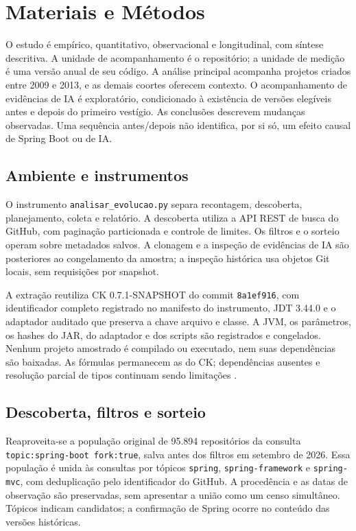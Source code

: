 \section{Materiais e Métodos}
\label{sec:metodologia}

O estudo é empírico, quantitativo, observacional e longitudinal, com síntese descritiva. A unidade de acompanhamento é o repositório; a unidade de medição é uma versão anual de seu código. A análise principal acompanha projetos criados entre 2009 e 2013, e as demais coortes oferecem contexto. O acompanhamento de evidências de IA é exploratório, condicionado à existência de versões elegíveis antes e depois do primeiro vestígio. As conclusões descrevem mudanças observadas. Uma sequência antes/depois não identifica, por si só, um efeito causal de Spring Boot ou de IA.

\subsection{Ambiente e instrumentos}
\label{subsec:ambiente}

O instrumento \texttt{analisar\_evolucao.py} separa recontagem, descoberta, planejamento, coleta e relatório. A descoberta utiliza a API REST de busca do GitHub, com paginação particionada e controle de limites. Os filtros e o sorteio operam sobre metadados salvos. A clonagem e a inspeção de evidências de IA são posteriores ao congelamento da amostra; a inspeção histórica usa objetos Git locais, sem requisições por snapshot.

A extração reutiliza CK 0.7.1-SNAPSHOT do commit \texttt{8a1ef916}, com identificador completo registrado no manifesto do instrumento, JDT 3.44.0 e o adaptador auditado que preserva a chave arquivo e classe. A JVM, os parâmetros, os hashes do JAR, do adaptador e dos scripts são registrados e congelados. Nenhum projeto amostrado é compilado ou executado, nem suas dependências são baixadas. As fórmulas permanecem as do CK; dependências ausentes e resolução parcial de tipos continuam sendo limitações \cite{aniche:ck,child:19}.

\subsection{Descoberta, filtros e sorteio}
\label{subsec:amostragem}

Reaproveita-se a população original de 95.894 repositórios da consulta \texttt{topic:spring-boot fork:true}, salva antes dos filtros em setembro de 2026. Essa população é unida às consultas por tópicos \texttt{spring}, \texttt{spring-framework} e \texttt{spring-mvc}, com deduplicação pelo identificador do GitHub. A procedência e as datas de observação são preservadas, sem apresentar a união como um censo simultâneo. Tópicos indicam candidatos; a confirmação de Spring ocorre no conteúdo das versões históricas.

